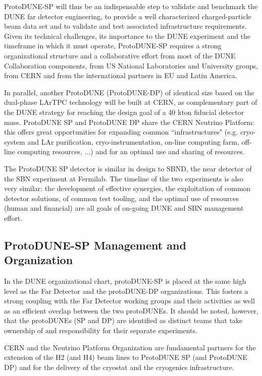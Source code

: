 ProtoDUNE-SP will thus be an indispensable step to validate and benchmark the DUNE far detector engineering, to provide a well characterized charged-particle beam data set and to validate and test associated infrastructure requirements. 
Given its technical challenges, its importance to the DUNE experiment and the timeframe in which it must operate, ProtoDUNE-SP requires a strong organizational structure and a collaborative effort from most of the DUNE Collaboration components,  
from US National Laboratories and University groups, from CERN and from the international partners in EU and Latin America. 

In parallel, another ProtoDUNE (ProtoDUNE-DP) of identical size based on the dual-phase LArTPC technology will be built at CERN, as complementary part of the DUNE strategy for reaching the design goal of a 40 kton fiducial detector mass.
ProtoDUNE SP and ProtoDUNE DP share the CERN Neutrino Platform: this offers great opportunities for expanding common ``infrastructures" (e.g. cryo-system and LAr purification, cryo-instrumentation, on-line computing farm, off-line computing resources, ...) and for an optimal use and sharing of resources.

The ProtoDUNE SP detector is similar in design to SBND, the near detector of the SBN experiment at Fermilab. The timeline of the two experiments is also very similar: the development of effective synergies, the exploitation of common detector solutions, of common test tooling, and the optimal use of resources (human and financial) are all goals of on-going DUNE and SBN management effort. 

\subsection{ProtoDUNE-SP Management and Organization}
In the DUNE organizational chart, protoDUNE-SP is placed at the same high level as the Far Detector and the protoDUNE-DP organizations. This fosters a strong coupling with the Far Detector working groups and their activities as well as an efficient 
 overlap between the two protoDUNEs. It should be noted, however, that the protoDUNEs (SP and DP) are identified as distinct teams that take ownership of and responsibility for their separate experiments.
 
CERN and the Neutrino Platform Organization are fundamental partners for the 
 extension of the H2 (and H4) beam lines to ProtoDUNE SP (and ProtoDUNE DP) and for the delivery of the cryostat and the cryogenics infrastructure.

